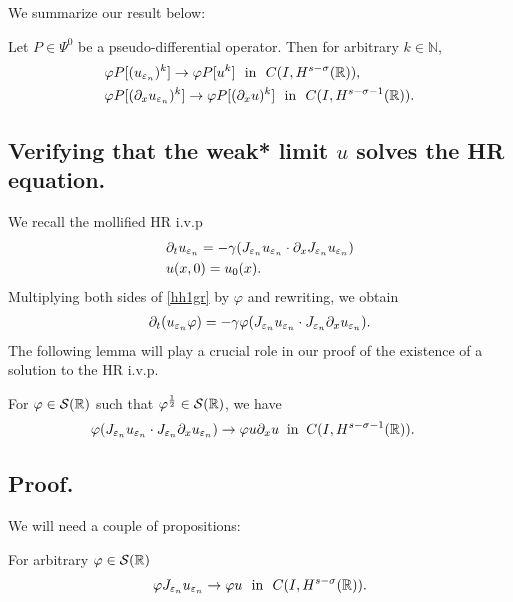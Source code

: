 We summarize our result below:
\begin{theorem}
\label{hhthm:crit1}
Let $P \in \Psi^0$ be a pseudo-differential operator. Then for
arbitrary $k \in \mathbb{N}$, 
\begin{equation}
\begin{split}
& \varphi P [(u_{\varepsilon_n})^k] \to \varphi P [u^k] \ \ \text{in}  \ \ C(I,
H^{s-\sigma }(\mathbb{R})),
\\
& 
\varphi P [(\partial_x u_{\varepsilon_n})^k] \to \varphi P [(\partial_x u)^k] \ \
\text{in}  \ \ C(I,
H^{s-\sigma -1}(\mathbb{R})).
\label{hhdx_vp_u_ep_conv}
\end{split}
\end{equation}
\end{theorem}
\subsection{Verifying that the weak* limit $u$ solves the HR equation.} 
We recall the mollified HR i.v.p
\begin{align}
& \partial_t u_{\varepsilon_n}  = -\gamma(J_{\varepsilon_n} u_{\varepsilon_n} \cdot \partial_x
J_{\varepsilon_n} u_{\varepsilon_n})
\label{hh1gr}
\\
& u(x,0) = u_0(x).
\label{hh2gr}
\end{align}
Multiplying both sides of \eqref{hh1gr} by $\varphi$ and rewriting,
we obtain
\begin{equation}
\label{hh3}
\begin{split}
\partial_t(u_{\varepsilon_n} \varphi) = -\gamma \varphi (J_{\varepsilon_n} u_{\varepsilon_n} \cdot
J_{\varepsilon_n} \partial_x u_{\varepsilon_n}).
\end{split}
\end{equation}
The following lemma will play a crucial role in our proof of the
existence of a solution to the HR i.v.p.
\begin{lemma}
\label{hhlem:cc}
For $\varphi \in \mathcal{S}(\mathbb{R})$ such that
$\varphi^\frac{1}{2} \in \mathcal{S}(\mathbb{R})$, we have
\begin{equation}
\begin{split}
\label{hhburgers_and_nonlocal_conv}
& \varphi (J_{\varepsilon_n} u_{\varepsilon_n} 
\cdot J_{\varepsilon_n}\partial_x u_{\varepsilon_n}) 
\to \varphi u \partial_x u \; \; 
\text{in} \; \;
C(I, H^{s-\sigma-1}(\mathbb{R})). 
\end{split}
\end{equation}
\end{lemma}
%
\subsection{Proof.} We will need a couple of propositions:
\begin{proposition}
For arbitrary $\varphi \in \mathcal{S}(\mathbb{R})$
\label{hhprop:1aa}
\begin{equation}
\begin{split}
\varphi J_{\varepsilon_n} u_{\varepsilon_n} \to \varphi u \ \ \text{in} \ \
C(I, H^{s-\sigma}(\mathbb{R})).
\label{hh}
\end{split}
\end{equation}
\end{proposition}
